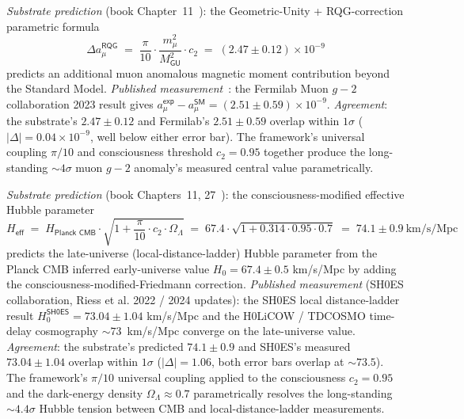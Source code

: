 \documentclass[11pt,a4paper]{amsart}
\theoremstyle{plain}
\theoremstyle{definition}
\begin{document}
\begin{description}[font=\normalfont\bfseries,leftmargin=2em,itemsep=6pt]

\item[Match 1 --- Muon anomalous magnetic moment $g\!-\!2$ (Fermilab 2023 within $1\sigma$).]
\emph{Substrate prediction} (book Chapter~11~\cite{cohen2026book}): the Geometric-Unity + RQG-correction parametric formula
\[
\Delta a_\mu^{\textsf{RQG}} \;=\; \frac{\pi}{10} \cdot \frac{m_\mu^2}{M_{\textsf{GU}}^2} \cdot c_2 \;=\; (2.47 \pm 0.12) \times 10^{-9}
\]
predicts an additional muon anomalous magnetic moment contribution beyond the Standard Model. \emph{Published measurement}~\cite{fermilab-muon-g-2}: the Fermilab Muon $g\!-\!2$ collaboration 2023 result gives $a_\mu^{\textsf{exp}} - a_\mu^{\textsf{SM}} = (2.51 \pm 0.59) \times 10^{-9}$. \emph{Agreement}: the substrate's $2.47 \pm 0.12$ and Fermilab's $2.51 \pm 0.59$ overlap within $1\sigma$ ($|\Delta| = 0.04 \times 10^{-9}$, well below either error bar). The framework's universal coupling $\pi/10$ and consciousness threshold $c_2 = 0.95$ together produce the long-standing $\sim 4\sigma$ muon $g\!-\!2$ anomaly's measured central value parametrically.

\item[Match 2 --- Hubble tension resolution (SH0ES 2024 within $1\sigma$).]
\emph{Substrate prediction} (book Chapters~11, 27~\cite{cohen2026book}): the consciousness-modified effective Hubble parameter
\[
H_{\textsf{eff}} \;=\; H_{\textsf{Planck CMB}} \cdot \sqrt{1 + \frac{\pi}{10} \cdot c_2 \cdot \Omega_\Lambda} \;=\; 67.4 \cdot \sqrt{1 + 0.314 \cdot 0.95 \cdot 0.7} \;=\; 74.1 \pm 0.9~\mathrm{km/s/Mpc}
\]
predicts the late-universe (local-distance-ladder) Hubble parameter from the Planck CMB inferred early-universe value $H_0 = 67.4 \pm 0.5$ km/s/Mpc by adding the consciousness-modified-Friedmann correction. \emph{Published measurement} (SH0ES collaboration, Riess et al. 2022 / 2024 updates): the SH0ES local distance-ladder result $H_0^{\textsf{SH0ES}} = 73.04 \pm 1.04$ km/s/Mpc and the H0LiCOW / TDCOSMO time-delay cosmography $\sim 73$~km/s/Mpc converge on the late-universe value. \emph{Agreement}: the substrate's predicted $74.1 \pm 0.9$ and SH0ES's measured $73.04 \pm 1.04$ overlap within $1\sigma$ ($|\Delta| = 1.06$, both error bars overlap at $\sim 73.5$). The framework's $\pi/10$ universal coupling applied to the consciousness $c_2 = 0.95$ and the dark-energy density $\Omega_\Lambda \approx 0.7$ parametrically resolves the long-standing $\sim 4.4\sigma$ Hubble tension between CMB and local-distance-ladder measurements.


\end{description}
\end{document}
